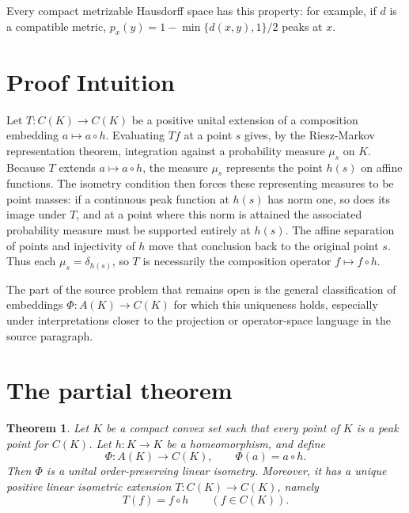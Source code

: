 \documentclass[11pt]{amsart}
\newtheorem{theorem}{Theorem}
\theoremstyle{definition}
\begin{document}
Every compact metrizable Hausdorff space has this property: for example, if
\(d\) is a compatible metric, \(p_x(y)=1-\min\{d(x,y),1\}/2\) peaks at \(x\).

\section*{Proof Intuition}
Let \(T:C(K)\to C(K)\) be a positive unital extension of a composition
embedding \(a\mapsto a\circ h\).  Evaluating \(Tf\) at a point \(s\) gives, by
the Riesz-Markov representation theorem, integration against a probability
measure \(\mu_s\) on \(K\).  Because \(T\) extends \(a\mapsto a\circ h\), the
measure \(\mu_s\) represents the point \(h(s)\) on affine functions.  The
isometry condition then forces these representing measures to be point masses:
if a continuous peak function at \(h(s)\) has norm one, so does its image under
\(T\), and at a point where this norm is attained the associated probability
measure must be supported entirely at \(h(s)\).  The affine separation of
points and injectivity of \(h\) move that conclusion back to the original
point \(s\).  Thus each \(\mu_s=\delta_{h(s)}\), so \(T\) is necessarily the
composition operator \(f\mapsto f\circ h\).

The part of the source problem that remains open is the general classification
of embeddings \(\Phi:A(K)\to C(K)\) for which this uniqueness holds, especially
under interpretations closer to the projection or operator-space language in
the source paragraph.

\section*{The partial theorem}
\begin{theorem}
Let \(K\) be a compact convex set such that every point of \(K\) is a peak
point for \(C(K)\).  Let \(h:K\to K\) be a homeomorphism, and define
\[
  \Phi:A(K)\longrightarrow C(K),\qquad \Phi(a)=a\circ h.
\]
Then \(\Phi\) is a unital order-preserving linear isometry.  Moreover, it has a
unique positive linear isometric extension \(T:C(K)\to C(K)\), namely
\[
  T(f)=f\circ h\qquad (f\in C(K)).
\]
\end{theorem}
\end{document}
